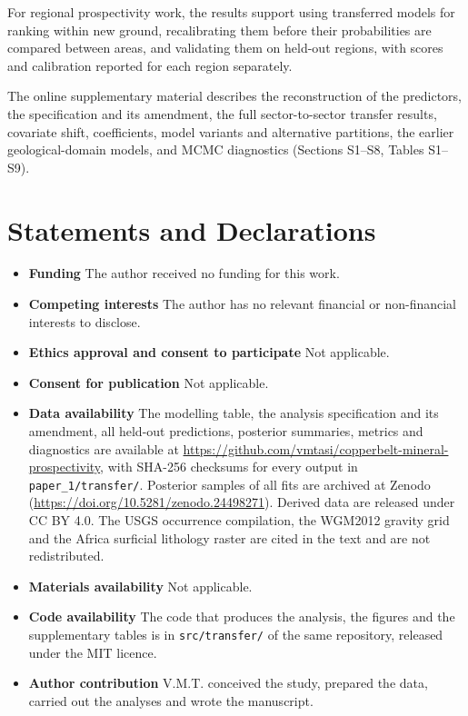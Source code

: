 \documentclass[pdflatex,sn-basic]{sn-jnl}%
\begin{document}
For regional prospectivity work, the results support using transferred models for ranking within new ground, recalibrating them before their probabilities are compared between areas, and validating them on held-out regions, with scores and calibration reported for each region separately.

\backmatter

The online supplementary material describes the reconstruction of the predictors, the specification and its amendment, the full sector-to-sector transfer results, covariate shift, coefficients, model variants and alternative partitions, the earlier geological-domain models, and MCMC diagnostics (Sections S1--S8, Tables S1--S9).

\section*{Statements and Declarations}

\begin{itemize}
\item \textbf{Funding} The author received no funding for this work.
\item \textbf{Competing interests} The author has no relevant financial or non-financial interests to disclose.
\item \textbf{Ethics approval and consent to participate} Not applicable.
\item \textbf{Consent for publication} Not applicable.
\item \textbf{Data availability} The modelling table, the analysis specification and its amendment, all held-out predictions, posterior summaries, metrics and diagnostics are available at \url{https://github.com/vmtasi/copperbelt-mineral-prospectivity}, with SHA-256 checksums for every output in \texttt{paper\_1/transfer/}. Posterior samples of all fits are archived at Zenodo (\url{https://doi.org/10.5281/zenodo.24498271}). Derived data are released under CC BY 4.0. The USGS occurrence compilation, the WGM2012 gravity grid and the Africa surficial lithology raster are cited in the text and are not redistributed.
\item \textbf{Materials availability} Not applicable.
\item \textbf{Code availability} The code that produces the analysis, the figures and the supplementary tables is in \texttt{src/transfer/} of the same repository, released under the MIT licence.
\item \textbf{Author contribution} V.M.T. conceived the study, prepared the data, carried out the analyses and wrote the manuscript.
\end{itemize}


\end{document}
